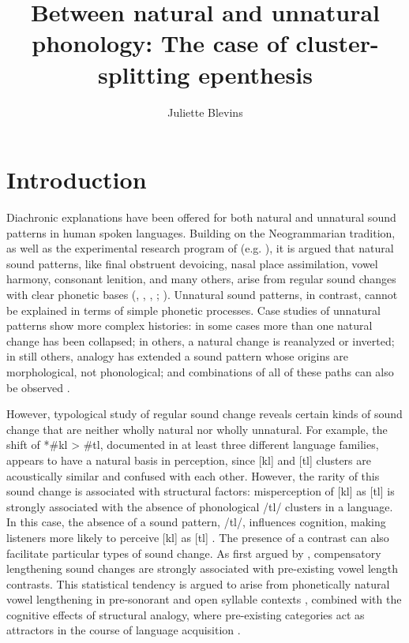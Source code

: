 \documentclass[output=paper,
modfonts
]{LSP/langsci}
\title{Between natural and unnatural phonology: The case of cluster-splitting epenthesis }
\author{Juliette Blevins}
\affiliation{The Graduate Center, CUNY}
\begin{document}
\maketitle

\section{Introduction}

Diachronic explanations have been offered for both natural and unnatural
sound patterns in human spoken languages. Building on the Neogrammarian
tradition, as well as the experimental research program of \citeauthor{ohala1971a} (e.g. \citeyear{ohala1971a, ohala1974a, ohala1993a}), it is argued that natural sound patterns, like final obstruent
devoicing, nasal place assimilation, vowel harmony, consonant lenition,
and many others, arise from regular sound changes with
clear phonetic bases (\citealt{blevins2004}, \citeyear{blevins2006b}, \citeyear{blevins2008a}, \citeyear{blevins2015a}; \citealt{anderson2016a}).
Unnatural sound patterns, in contrast, cannot be explained in terms of
simple phonetic processes. Case studies of unnatural patterns show more
complex histories: in some cases more than one natural change has been
collapsed; in others, a natural change is reanalyzed or inverted; in
still others, analogy has extended a sound pattern whose origins are
morphological, not phonological; and combinations of all of these paths
can also be observed \citep{bach1972a,anderson1981,buckley2000a,vaux2002a,blevins2008b,blevins2008c,blevinsju2009a,anderson2016a}.

However, typological study of regular sound change reveals certain kinds
of sound change that are neither wholly natural nor wholly unnatural.
For example, the shift of *\#kl \textgreater{} \#tl, documented in at
least three different language families, appears to have a natural basis
in perception, since {[}kl{]} and {[}tl{]} clusters are acoustically
similar and confused with each other. However, the rarity of this sound
change is associated with structural factors: misperception of {[}kl{]}
as {[}tl{]} is strongly associated with the absence of phonological /tl/
clusters in a language. In this case, the absence of a sound pattern,
/tl/, influences cognition, making listeners more likely to perceive
{[}kl{]} as {[}tl{]} \citep{blevinsju2009a}. The presence of a
contrast can also facilitate particular types of sound change. As first
argued by \citet{deChene1979}, compensatory lengthening sound
changes are strongly associated with pre-existing vowel length
contrasts. This statistical tendency is argued to arise from
phonetically natural vowel lengthening in pre-sonorant and open syllable
contexts \citep{kavitskaya2002}, combined with the cognitive effects of
structural analogy, where pre-existing categories act as attractors in
the course of language acquisition \citep[150--155]{blevins2004}.
\end{document}
